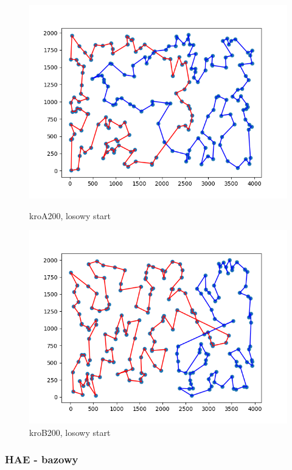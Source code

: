 \documentclass[11pt]{article}
\begin{document}
\begin{figure}[H]
    \begin{minipage}[t]{0.45\textwidth}
        \centering
        \includegraphics[width=\linewidth]{best_paths/kroA200/LNS_no_LS}
        \caption{kroA200, losowy start}
    \end{minipage}
    \hfill
    \begin{minipage}[t]{0.45\textwidth}
        \centering
        \includegraphics[width=\linewidth]{best_paths/kroB200/LNS_no_LS}
        \caption{kroB200, losowy start}
    \end{minipage}\label{fig:figure4}
\end{figure}

\subsubsection{HAE - bazowy}
\end{document}
